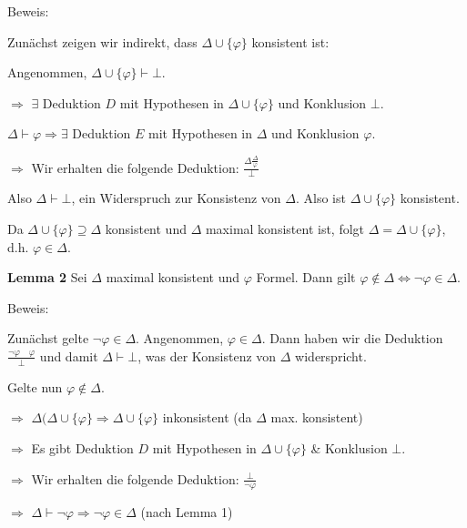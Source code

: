 \documentclass[a4paper]{article}
\renewcommand{\note}[2]{\begin{noteBox} \textbf{#1} #2 \end{noteBox}}
\begin{document}
\begin{multicols}{3}
  Beweis:
  \begin{enumerate*}
    \item Zunächst zeigen wir indirekt, dass $\Delta\cup\{\varphi\}$ konsistent ist:
    \begin{itemize*}
      \item Angenommen, $\Delta\cup\{\varphi\}\vdash\bot$.
      \item $\Rightarrow$ $\exists$ Deduktion $D$ mit Hypothesen in $\Delta\cup\{\varphi\}$ und Konklusion $\bot$.
      \item $\Delta\vdash \varphi \Rightarrow \exists$ Deduktion $E$ mit Hypothesen in $\Delta$ und Konklusion $\varphi$.
      \item $\Rightarrow$ Wir erhalten die folgende Deduktion: $\frac{\Delta \frac{\Delta}{\varphi}}{\bot}$
      \item Also $\Delta\vdash\bot$, ein Widerspruch zur Konsistenz von $\Delta$. Also ist $\Delta\cup\{\varphi\}$ konsistent.
    \end{itemize*}
    \item Da $\Delta\cup\{\varphi\}\supseteq\Delta$ konsistent und $\Delta$ maximal konsistent ist, folgt $\Delta=\Delta\cup\{\varphi\}$, d.h. $\varphi\in\Delta$.
  \end{enumerate*}

  \note{Lemma 2}{Sei $\Delta$ maximal konsistent und $\varphi$ Formel. Dann gilt $\varphi\not\in\Delta\Leftrightarrow\lnot\varphi\in\Delta$.}

  Beweis:
  \begin{itemize*}
    \item Zunächst gelte $\lnot\varphi\in\Delta$. Angenommen, $\varphi\in\Delta$. Dann haben wir die Deduktion $\frac{\lnot\varphi\quad\varphi}{\bot}$ und damit $\Delta\vdash\bot$, was der Konsistenz von $\Delta$ widerspricht.
    \item Gelte nun $\varphi\not\in\Delta$.
    \begin{itemize*}
      \item $\Rightarrow$ $\Delta(\Delta\cup\{\varphi\}\Rightarrow\Delta\cup\{\varphi\}$ inkonsistent (da $\Delta$ max. konsistent)
      \item $\Rightarrow$ Es gibt Deduktion $D$ mit Hypothesen in $\Delta\cup\{\varphi\}$ \& Konklusion $\bot$.
      \item $\Rightarrow$ Wir erhalten die folgende Deduktion: $\frac{\bot}{\lnot\varphi}$
      \item $\Rightarrow$ $\Delta\vdash\lnot\varphi\Rightarrow\lnot\varphi\in\Delta$ (nach Lemma 1)
    \end{itemize*}
  \end{itemize*}


\end{multicols}
\end{document}
